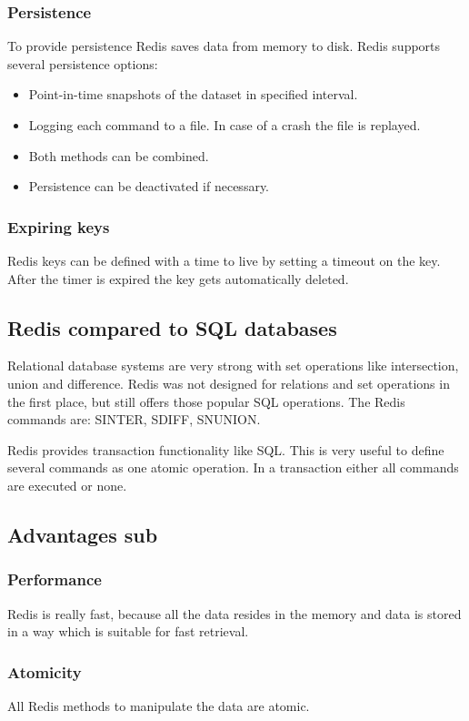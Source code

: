 \subsubsection{Persistence}
To provide persistence Redis saves data from memory to disk. Redis supports
several persistence options\cite{persistenceredis}:
\begin{itemize}
    \item Point-in-time snapshots of the dataset in specified interval.
    \item Logging each command to a file. In case of a crash the file is
    replayed.
    \item Both methods can be combined.
    \item Persistence can be deactivated if necessary.
\end{itemize}

\subsubsection{Expiring keys}
Redis keys can be defined with a time to live by setting a timeout on the key.
After the timer is expired the key gets automatically deleted.

\subsection{Redis compared to SQL databases}
Relational database systems are very strong with set operations like
intersection, union and difference. Redis was not designed for relations and set
operations in the first place, but still offers those popular SQL operations.
The Redis commands are: SINTER, SDIFF, SNUNION.

Redis provides transaction functionality like SQL. This is very useful to define
several commands as one atomic operation. In a transaction either all commands
are executed or none.

\subsection{Advantages sub}
\subsubsection{Performance}
Redis is really fast, because all the data resides in the memory and data is
stored in a way which is suitable for fast retrieval.

\subsubsection{Atomicity}
All Redis methods to manipulate the data are atomic.


